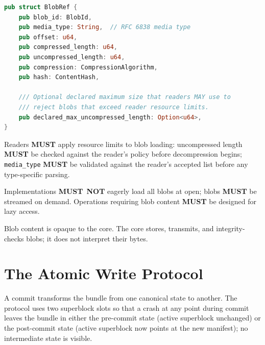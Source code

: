 \documentclass[11pt,letterpaper]{report}
\newcounter{requirement}[chapter]
\newcommand{\MUST}{\textbf{MUST}}
\newcommand{\MUSTNOT}{\textbf{MUST}\nobreak\ \textbf{NOT}}
\begin{document}
\begin{lstlisting}[language=Rust]
pub struct BlobRef {
    pub blob_id: BlobId,
    pub media_type: String,  // RFC 6838 media type
    pub offset: u64,
    pub compressed_length: u64,
    pub uncompressed_length: u64,
    pub compression: CompressionAlgorithm,
    pub hash: ContentHash,

    /// Optional declared maximum size that readers MAY use to
    /// reject blobs that exceed reader resource limits.
    pub declared_max_uncompressed_length: Option<u64>,
}
\end{lstlisting}

\begin{requirement}
  \label{req:format:lazy-bounded-blobs}
  Readers \MUST{} apply resource limits to blob loading:
  uncompressed length \MUST{} be checked against the reader's
  policy before decompression begins; \texttt{media\_type} \MUST{}
  be validated against the reader's accepted list before any
  type-specific parsing.

  Implementations \MUSTNOT{} eagerly load all blobs at open;
  blobs \MUST{} be streamed on demand. Operations requiring blob
  content \MUST{} be designed for lazy access.

  Blob content is opaque to the core. The core stores, transmits,
  and integrity-checks blobs; it does not interpret their bytes.
\end{requirement}

\section{The Atomic Write Protocol}
\label{sec:format:commit}

A commit transforms the bundle from one canonical state to another.
The protocol uses two superblock slots so that a crash at any point
during commit leaves the bundle in either the pre-commit state
(active superblock unchanged) or the post-commit state (active
superblock now points at the new manifest); no intermediate state
is visible.
\end{document}
